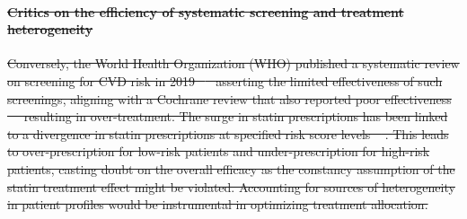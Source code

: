\documentclass[10pt,letterpaper]{article}
\providecommand{\DIFdeltex}[1]{{\protect\color{red}\sout{#1}}}                      %
\providecommand{\DIFdelbegin}{} %
\providecommand{\DIFdelend}{} %
\providecommand{\DIFdel}[1]{\texorpdfstring{\DIFdeltex{#1}}{}} %
\newcommand{\DIFscaledelfig}{0.5}
\newlength{\DIFdelgraphicswidth} %
\newlength{\DIFdelgraphicsheight} %
\newcommand{\DIFdelincludegraphics}[2][]{%
\sbox{\DIFdelgraphicsbox}{\DIFOincludegraphics[#1]{#2}}%
\settoboxwidth{\DIFdelgraphicswidth}{\DIFdelgraphicsbox} %
\settoboxtotalheight{\DIFdelgraphicsheight}{\DIFdelgraphicsbox} %
\scalebox{\DIFscaledelfig}{%
\parbox[b]{\DIFdelgraphicswidth}{\usebox{\DIFdelgraphicsbox}\\[-\baselineskip] \rule{\DIFdelgraphicswidth}{0em}}\llap{\resizebox{\DIFdelgraphicswidth}{\DIFdelgraphicsheight}{%
\setlength{\unitlength}{\DIFdelgraphicswidth}%
\begin{picture}(1,1)%
\thicklines\linethickness{2pt} %
{\color[rgb]{1,0,0}\put(0,0){\framebox(1,1){}}}%
{\color[rgb]{1,0,0}\put(0,0){\line( 1,1){1}}}%
{\color[rgb]{1,0,0}\put(0,1){\line(1,-1){1}}}%
\end{picture}%
}\hspace*{3pt}}} %
} %
\DeclareRobustCommand{\DIFdelbegin}{\DIFOdelbegin \let\includegraphics\DIFdelincludegraphics} %
\DeclareRobustCommand{\DIFdelend}{\DIFOaddend \let\includegraphics\DIFOincludegraphics} %
\begin{document}
\DIFdelbegin \paragraph{\DIFdel{Critics on the efficiency of systematic screening and treatment heterogeneity}}
\addtocounter{paragraph}{-1}%
\DIFdel{Conversely, the World Health Organization (WHO) published a systematic review on screening for CVD risk in 2019 \mbox{%
    \cite{eriksen2021effectiveness} }\hskip0pt%
  asserting the limited effectiveness of such screenings, aligning with a Cochrane review that also reported poor effectiveness \mbox{%
    \cite{krogsboll2012general} }\hskip0pt%
  resulting in over-treatment. The surge in statin prescriptions has been linked to a divergence in statin prescriptions at specified risk score levels \mbox{%
    \cite{van2013efficiency}}\hskip0pt%
  . This leads to over-prescription for low-risk patients and under-prescription for high-risk patients, casting doubt on the overall efficacy as the constancy assumption of the statin treatment effect might be violated. Accounting for sources of heterogeneity in patient profiles would be instrumental in optimizing treatment allocation.
}\DIFdelend %
\end{document}
